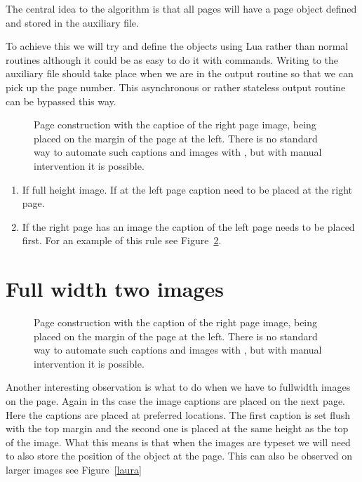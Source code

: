 The central idea to the algorithm is that all pages will have a page object defined and stored in the auxiliary
file. 

To achieve this we will try and define the objects using Lua rather than normal \tex routines although it could be as easy to do it with \tex commands. Writing to the auxiliary file should take place when we are in the output routine so that we can pick up the page number. This asynchronous or rather stateless output routine can be bypassed this way.

\begin{figure}[tbp]
\caption{Page construction with the captioe  of the right page image, being placed on the margin of the page at the left. There is no standard way to automate such captions and images with \latexe, but with manual
intervention it is possible.}
\label{elizabeth}
\end{figure}

\begin{enumerate}
\item If full height image. If at the left page caption need to be placed at the right page.
\item If the right page has an image the caption of the left page needs to be placed first.
         For an example of this rule see Figure~\ref{elizabeth}.
\end{enumerate}

\section{Full width two images}

\begin{figure}[tbp]
\caption{Page construction with the caption  of the right page image, being placed on the margin of the page at the left. There is no standard way to automate such captions and images with \latexe, but with manual
intervention it is possible.}
\label{elizabeth}
\end{figure}

Another interesting observation is what to do when we have to fullwidth images on the page. Again in ths case the image captions are placed on the next page. Here the captions are placed at preferred locations. The first caption
is set flush with the top margin and the second one is placed at the same height as the top of the image. What this means is that when the images are typeset we will  need to also store the position of the object at the page. This can also be observed on larger images see Figure~\ref{laura}

